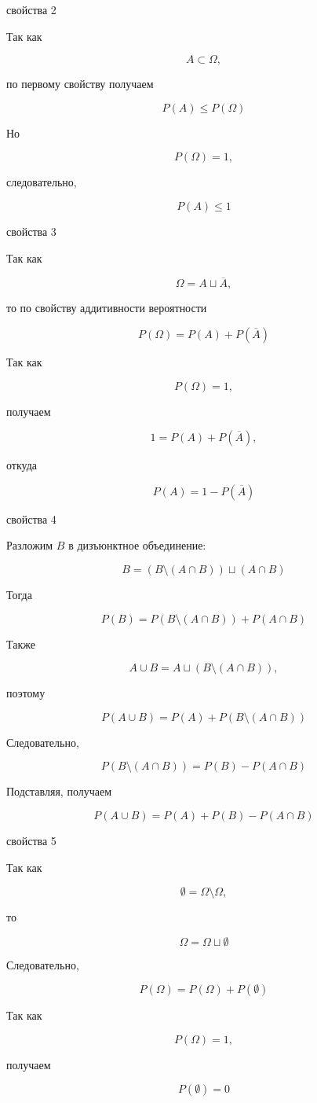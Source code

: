 \documentclass[12pt,a4paper]{article}
\begin{document}
\begin{proofbox}{свойства 2}

Так как

\[
A\subset\Omega,
\]

по первому свойству получаем

\[
P(A)\leq P(\Omega)
\]

Но

\[
P(\Omega)=1,
\]

следовательно,

\[
P(A)\leq1
\]

\end{proofbox}

\begin{proofbox}{свойства 3}

Так как

\[
\Omega=A\sqcup\overline{A},
\]

то по свойству аддитивности вероятности

\[
P(\Omega)
=
P(A)+P(\overline{A})
\]

Так как

\[
P(\Omega)=1,
\]

получаем

\[
1=P(A)+P(\overline{A}),
\]

откуда

\[
P(A)=1-P(\overline{A})
\]

\end{proofbox}

\begin{proofbox}{свойства 4}

Разложим $B$ в дизъюнктное объединение:

\[
B=(B\setminus(A\cap B))\sqcup(A\cap B)
\]

Тогда

\[
P(B)
=
P(B\setminus(A\cap B))
+
P(A\cap B)
\]

Также

\[
A\cup B
=
A\sqcup(B\setminus(A\cap B)),
\]

поэтому

\[
P(A\cup B)
=
P(A)+P(B\setminus(A\cap B))
\]

Следовательно,

\[
P(B\setminus(A\cap B))
=
P(B)-P(A\cap B)
\]

Подставляя, получаем

\[
P(A\cup B)
=
P(A)+P(B)-P(A\cap B)
\]

\end{proofbox}

\begin{proofbox}{свойства 5}

Так как

\[
\emptyset=\Omega\setminus\Omega,
\]

то

\[
\Omega=\Omega\sqcup\emptyset
\]

Следовательно,

\[
P(\Omega)
=
P(\Omega)+P(\emptyset)
\]

Так как

\[
P(\Omega)=1,
\]

получаем

\[
P(\emptyset)=0
\]

\end{proofbox}
\end{document}
